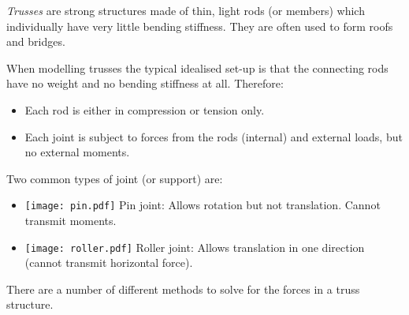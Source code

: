 {\em Trusses} are strong structures made of thin, light rods (or members)
which individually have very little bending stiffness. They are often used to
form roofs and bridges.

When modelling trusses the typical idealised set-up is that the connecting
rods have no weight and no bending stiffness at all. Therefore:
\begin{itemize}
 \item Each rod is either in compression or tension only.
 \item Each joint is subject to forces from the rods (internal) and external
   loads, but no external moments.
\end{itemize}


Two common types of joint (or support) are:
\begin{itemize}
 \item
   \texttt{[image: pin.pdf]}
   Pin joint: Allows rotation but not translation. Cannot transmit moments.
 \item
   \texttt{[image: roller.pdf]}
   Roller joint: Allows translation in one direction (cannot transmit
   horizontal force).
\end{itemize}

There are a number of different methods to solve for the forces in a truss
structure.

